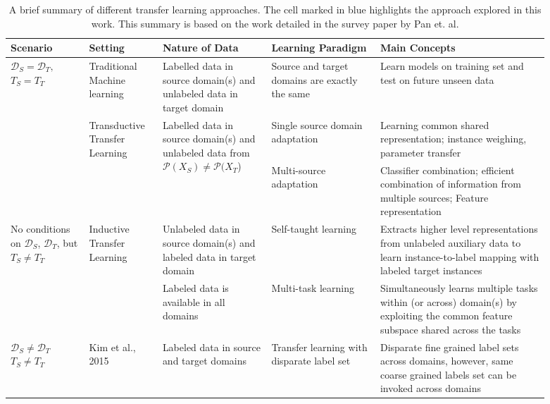 \documentclass{sigkddExp}
\begin{document}
\begin{table}[th]
\begin{tabular*}{\linewidth}{m{0.13\linewidth}m{0.12\linewidth}m{0.18\linewidth}m{0.18\linewidth}m{0.28\linewidth}}
\toprule
\toprule
\textbf{Scenario} & \textbf{Setting} & \textbf{Nature of Data} & \textbf{Learning Paradigm} & \textbf{Main Concepts}  \\
\toprule 
 \makecell{$\mathcal{D}_S = \mathcal{D}_T,$\\$ T_S = T_T$}
& Traditional Machine learning
& Labelled data in source domain(s) and unlabeled data in target domain
& Source and target domains are exactly the same
& Learn models on training set and test on future unseen data \\
\cmidrule{1-5}
 \multirow{2}{\linewidth}{\textbf{\makecell{$\mathcal{D}_S \neq \mathcal{D}_T$,\\ $T_S = T_T$}}} 
& \multirow{2}{\linewidth}{Transductive Transfer Learning}
& \multirow{2}{\linewidth}{Labelled data in source domain(s) and unlabeled data from $\mathcal{P}(X_S) \neq \mathcal{P}(X_T$)}
& Single source domain adaptation
\cellcolor{blue!25}
& Learning common shared representation; instance weighing, parameter transfer
\\
\cmidrule{4-5}
 
&
&
& Multi-source adaptation
& Classifier combination; efficient combination of information from multiple sources; Feature representation \\
\cmidrule{1-5} 

\multirow{2}{\linewidth}{No conditions on $\mathcal{D}_S$, $\mathcal{D}_T$, 
but $T_S \neq T_T$ }
& \multirow{2}{\linewidth}{Inductive Transfer Learning}
& Unlabeled data in source domain(s) and labeled data in target domain
& Self-taught learning
& Extracts higher level representations from unlabeled auxiliary data to learn instance-to-label mapping with labeled target instances
\\
\cmidrule{3-5} 
& & Labeled data is available in all domains
& Multi-task learning
& Simultaneously learns multiple tasks within (or across) domain(s) by exploiting the common feature subspace shared across the tasks \\
\cmidrule{1-5}
\makecell{$\mathcal{D}_S\neq \mathcal{D}_T$\\$T_S \neq T_T$}
& Kim et al., 2015 \cite{kim2015new}
& Labeled data in source and target domains
& Transfer learning with disparate label set
& Disparate fine grained label sets across domains, however, same coarse grained labels set can be invoked across domains
\\
\bottomrule
\end{tabular*}
\caption {A brief summary of different transfer learning approaches. The cell marked in blue highlights the approach explored in this work. This summary is based on the work detailed in the survey paper by Pan et. al.\protect\cite{pan2010survey}}
\label{tab:related_work}
\end{table}
\end{document}
